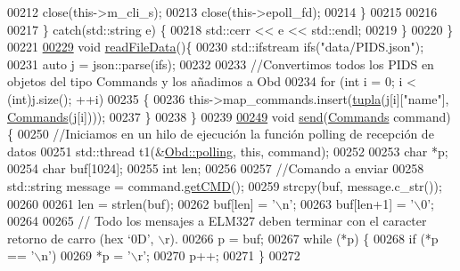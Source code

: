\begin{DoxyCode}
{{{{{{00212                 close(this->m\_cli\_s);
00213                 close(this->epoll\_fd);
00214             \}
00215 
00216 
00217         \} \textcolor{keywordflow}{catch}(std::string e) \{
00218             std::cerr << e << std::endl;
00219         \}
00220     \}
00221 
\hyperlink{classObd_a2b8bd75834351a2205d53aec8b3747be}{00229}     \textcolor{keywordtype}{void} \hyperlink{classObd_a2b8bd75834351a2205d53aec8b3747be}{readFileData}()\{
00230         std::ifstream ifs(\textcolor{stringliteral}{"data/PIDS.json"});
00231         \textcolor{keyword}{auto} j = json::parse(ifs);
00232 
00233         \textcolor{comment}{//Convertimos todos los PIDS en objetos del tipo Commands y los añadimos a Obd}
00234         \textcolor{keywordflow}{for} (\textcolor{keywordtype}{int} i = 0; i < (int)j.size(); ++i)
00235         \{
00236             this->map\_commands.insert(\hyperlink{Obd_8hpp_aaa63a77fc61ef01154d73b6fac67f1af}{tupla}(j[i][\textcolor{stringliteral}{"name"}], \hyperlink{classCommands}{Commands}(j[i])));
00237         \}
00238     \}
00239     
\hyperlink{classObd_a453591bc9a280e8d44d82025ce8590e9}{00249}     \textcolor{keywordtype}{void} \hyperlink{classObd_a453591bc9a280e8d44d82025ce8590e9}{send}(\hyperlink{classCommands}{Commands} command)\{
00250         \textcolor{comment}{//Iniciamos en un hilo de ejecución la función polling de recepción de datos}
00251         std::thread t1(&\hyperlink{classObd_a0792ecb9247f32760269fdf64a178f8f}{Obd::polling}, \textcolor{keyword}{this}, command);
00252 
00253         \textcolor{keywordtype}{char} *p;
00254         \textcolor{keywordtype}{char} buf[1024];
00255         \textcolor{keywordtype}{int} len;
00256 
00257         \textcolor{comment}{//Comando a enviar}
00258         std::string message = command.\hyperlink{classCommands_a9aee21ab91fdfc8e9daa59e1e8f20b73}{getCMD}();
00259         strcpy(buf, message.c\_str());
00260 
00261         len = strlen(buf);
00262         buf[len] = \textcolor{charliteral}{'\(\backslash\)n'};
00263         buf[len+1] = \textcolor{charliteral}{'\(\backslash\)0'};
00264         
00265         \textcolor{comment}{// Todo los mensajes a ELM327  deben terminar con el caracter retorno de carro (hex  ‘0D’, \(\backslash\)r).}
00266         p = buf;
00267         \textcolor{keywordflow}{while} (*p) \{
00268             \textcolor{keywordflow}{if} (*p == \textcolor{charliteral}{'\(\backslash\)n'})
00269                 *p = \textcolor{charliteral}{'\(\backslash\)r'};
00270             p++;
00271         \}
00272         
}}}}}}
\end{DoxyCode}
